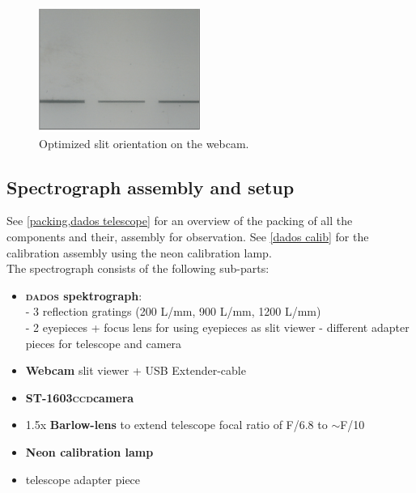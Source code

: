 \documentclass[a4paper, 11pt, fleqn]{memoir}
\begin{document}
\begin{figure}[t!]
    \centering
    \includegraphics[width=0.47\textwidth]{slit-orientation}
    \caption{Optimized slit orientation on the webcam.}
    \label{slits}
\end{figure}

\subsection{Spectrograph assembly and setup}

See \cref{packing,dados telescope} for an overview of the packing of all the components and their, assembly for observation.
See \cref{dados calib} for the calibration assembly using the neon calibration lamp.
\\

The spectrograph consists of the following sub-parts:
\begin{itemize}
    \item \textbf{\textsc{dados} spektrograph}:\\ - 3 reflection gratings (200 L/mm, 900 L/mm, 1200 L/mm)\\ - 2 eyepieces + focus lens for using eyepieces as slit viewer - different adapter pieces for telescope and camera
    \item \textbf{Webcam} slit viewer + USB Extender-cable
    \item \textbf{ST-1603\textsc{ccd}camera}
    \item 1.5x \textbf{Barlow-lens} to extend telescope focal ratio of F/6.8 to $\sim$F/10
    \item \textbf{Neon calibration lamp}
    \item telescope adapter piece
\end{itemize}
\end{document}
